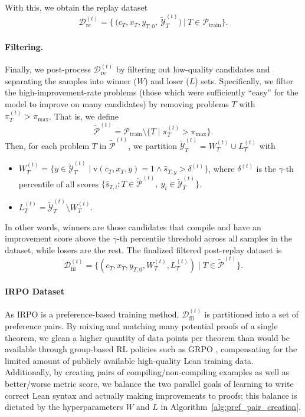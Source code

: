 \noindent With this, we obtain the replay dataset
\[
\mathcal{D}^{(t)}_{\mathrm{re}} = \Big\{\,\big(c_T,x_T,y_{T,0},\ \mathcal{\widetilde{Y}}^{(t)}_T\big)\ \Big|\ T\in\mathcal{P}_{\mathrm{train}}\Big\}.
\]

\paragraph{Filtering.}
Finally, we post-process $\mathcal{D}^{(t)}_{\mathrm{re}}$ by filtering out low-quality candidates and separating the samples into winner ($W$) and loser ($L$) sets. Specifically, we filter the high-improvement-rate problems (those which were sufficiently ``easy'' for the model to improve on many candidates) by removing problems $T$ with $\pi_T^{(t)} > \pi_{\max}$. That is, we define
\[
\widetilde{\mathcal{P}}^{(t)} = \mathcal{P}_{\mathrm{train}} \setminus \{T \mid \pi_T^{(t)} > \pi_{\max}\}.
\]
Then, for each problem $T$ in $\widetilde{\mathcal{P}}^{(t)}$, we partition $\mathcal{\widetilde{Y}}^{(t)}_T = W_T^{(t)} \cup L_T^{(t)}$ with
\begin{itemize}
    \item $W_T^{(t)} = \{y \in \mathcal{\widetilde{Y}}^{(t)}_T \mid \text{v}(c_T,x_T,y) = 1 \land \widehat{s}_{T,y} > \delta^{(t)}\}$, where $\delta^{(t)}$ is the $\gamma$-th percentile of all scores $\{\widehat{s}_{T,i} : T \in \widetilde{\mathcal{P}}^{(t)},\ y_i \in \mathcal{\widetilde{Y}}^{(t)}_T\}$.
    \item $L_T^{(t)} = \mathcal{\widetilde{Y}}^{(t)}_T \setminus W_T^{(t)}$.
\end{itemize}
In other words, winners are those candidates that compile and have an improvement score above the $\gamma$-th percentile threshold across all samples in the dataset, while losers are the rest. The finalized filtered post-replay dataset is
\[
\mathcal{D}_{\text{fil}}^{(t)} = \Big\{(c_T,x_T,y_{T,0},W_T^{(t)},L_T^{(t)}) \mid T \in \widetilde{\mathcal{P}}^{(t)}\Big\}.
\]


\paragraph{IRPO Dataset}
As IRPO is a preference-based training method, $\mathcal{D}_{\text{fil}}^{(t)}$ is partitioned into a set of preference pairs. By mixing and matching many potential proofs of a single theorem, we glean a higher quantity of data points per theorem than would be available through group-based RL policies such as GRPO \cite{GRPO}, compensating for the limited amount of publicly available high-quality Lean training data. Additionally, by creating pairs of compiling/non-compiling examples as well as better/worse metric score, we balance the two parallel goals of learning to write correct Lean syntax and actually making improvements to proofs; this balance is dictated by the hyperparameters $W$ and $L$ in Algorithm~\ref{alg:pref_pair_creation}.

